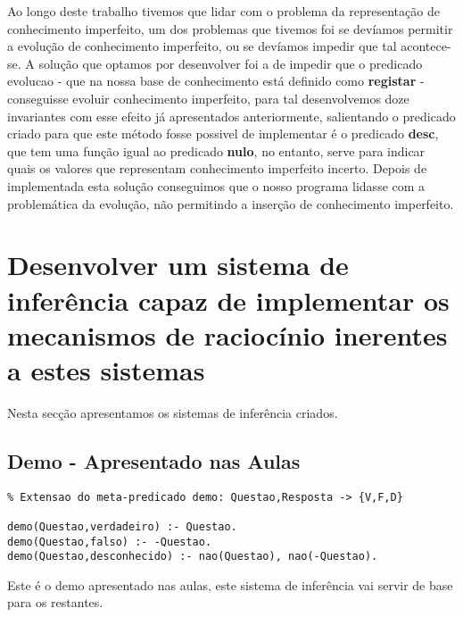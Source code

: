 \documentclass{report}
\begin{document}
Ao longo deste trabalho tivemos que lidar com o problema da representação de conhecimento imperfeito, um dos problemas que tivemos foi se devíamos permitir a evolução de conhecimento imperfeito, ou se devíamos impedir que tal acontece-se. 
A solução que optamos por desenvolver foi a de impedir que o predicado evolucao - que na nossa base de conhecimento está definido como \textbf{registar} - conseguisse evoluir conhecimento imperfeito, para tal desenvolvemos doze invariantes com esse efeito já apresentados anteriormente, salientando o predicado criado para que este método fosse possivel de implementar é o predicado \textbf{desc}, que tem uma função igual ao predicado \textbf{nulo}, no entanto, serve para indicar quais os valores que representam conhecimento imperfeito incerto. 
Depois de implementada esta solução conseguimos que o nosso programa lidasse com a problemática da evolução, não permitindo a inserção de conhecimento imperfeito.























\section{Desenvolver um sistema de inferência capaz de implementar os mecanismos de raciocínio inerentes a estes sistemas}

Nesta secção apresentamos os sistemas de inferência criados.

\subsection{Demo - Apresentado nas Aulas}

\begin{verbatim}
% Extensao do meta-predicado demo: Questao,Resposta -> {V,F,D}

demo(Questao,verdadeiro) :- Questao.
demo(Questao,falso) :- -Questao.
demo(Questao,desconhecido) :- nao(Questao), nao(-Questao).
\end{verbatim}

Este é o demo apresentado nas aulas, este sistema de inferência vai servir de base para os restantes.
\end{document}
